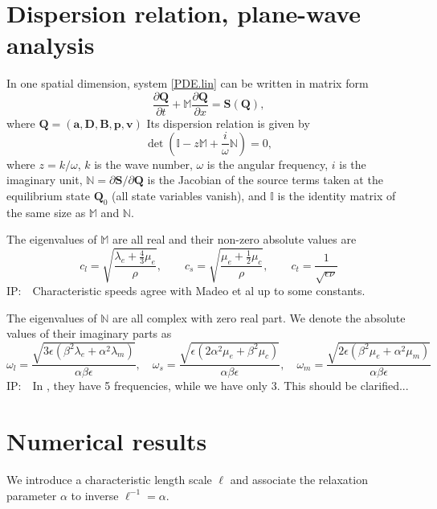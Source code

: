 \documentclass[
10pt, %
a4paper, %
oneside, %
headinclude,footinclude, %
BCOR5mm, %
table,
]{scrartcl}
\newcommand{\vv}{\bm{v}}
\newcommand{\QQ}{\bm{Q}}
\renewcommand{\SS}{\bm{S}}
\newcommand{\IP}[1]{{\color{Red}IP:\ \ #1}}
\newcommand{\pd}{\partial}
\newcommand{\Burg}{ \bm{B} }	%
\newcommand{\Durg}{ \bm{D} }	%
\newcommand{\Distsmall}{ \bm{a} }	%
\newcommand{\Plastsmall}{ \bm{p} }	%
\begin{document}
\section{Dispersion relation, plane-wave analysis}

In one spatial dimension, system \eqref{PDE.lin} can be written in matrix form 
\begin{equation}
\frac{\pd \QQ}{\pd t} + \mathbb{M} \frac{\pd\QQ}{\pd x} = \SS(\QQ),
\end{equation}
where $ \QQ = (\Distsmall,\Durg,\Burg,\Plastsmall,\vv)$
Its dispersion relation is given by
\begin{equation}
\det(\mathbb{I} - z \mathbb{M}+\frac{i}{\omega}\mathbb{N}) = 0,
\end{equation}
where $ z = k/\omega $, $ k $ is the wave number, $ \omega $ is the angular frequency,  $ i $ is 
the imaginary unit, $ \mathbb{N} = \pd\SS/\pd\QQ$ is the Jacobian of the source terms taken at the 
equilibrium state $ \QQ_0 $ (all state variables vanish), and $ 
\mathbb{I} $ is the identity matrix of the same size as $ \mathbb{M} $ and $ \mathbb{N} $.

The eigenvalues of $ \mathbb{M} $ are all real and their non-zero absolute values are
\begin{equation}
c_l = \sqrt{\frac{\lambda_e + \frac{4}{3}\mu_e}{\rho}}, \qquad 
%
c_s = \sqrt{\frac{\mu_e + \frac{1}{2}\mu_c}{\rho}}, \qquad 
%
c_t = \frac{1}{\sqrt{\epsilon\nu}}
\end{equation}
\IP{Characteristic speeds agree with Madeo et al \cite{Madeo2015a} up to some constants.}

The eigenvalues of $ \mathbb{N} $ are all complex with zero real part. We denote the absolute 
values of their imaginary 
parts as
\begin{equation}
\omega_l = \frac{\sqrt{3\epsilon(\beta^2 \lambda_e + \alpha^2 
\lambda_m)}}{\alpha\beta\epsilon},\quad
%
\omega_s = \frac{\sqrt{\epsilon (2 \alpha^2 \mu_e + \beta^2 \mu_c)}}{\alpha \beta \epsilon},\quad
%
\omega_m = \frac{\sqrt{2\epsilon (\beta^2 \mu_e + \alpha^2 \mu_m)}}{\alpha \beta \epsilon}
\end{equation}
\IP{In \cite{Madeo2015a}, they have 5 frequencies, while we have only 3. This should be 
clarified...}


\section{Numerical results}


We introduce a characteristic length scale $ \ell $ and associate the relaxation parameter $ \alpha 
$ to inverse $ \ell^{-1} = \alpha $.
\end{document}
